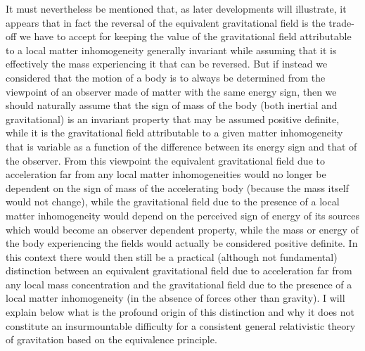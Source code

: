 \documentclass[notitlepage,12pt]{report}
\begin{document}
It must nevertheless be mentioned that, as later developments will illustrate, it appears that in fact the reversal of the equivalent gravitational field is the trade-off we have to accept for keeping the value of the gravitational field attributable to a local matter inhomogeneity generally invariant while assuming that it is effectively the mass experiencing it that can be reversed. But if instead we considered that the motion of a body is to always be determined from the viewpoint of an observer made of matter with the same energy sign, then we should naturally assume that the sign of mass of the body (both inertial and gravitational) is an invariant property that may be assumed positive definite, while it is the gravitational field attributable to a given matter inhomogeneity that is variable as a function of the difference between its energy sign and that of the observer. From this viewpoint the equivalent gravitational field due to acceleration far from any local matter inhomogeneities would no longer be dependent on the sign of mass of the accelerating body (because the mass itself would not change), while the gravitational field due to the presence of a local matter inhomogeneity would depend on the perceived sign of energy of its sources which would become an observer dependent property, while the mass or energy of the body experiencing the fields would actually be considered positive definite. In this context there would then still be a practical (although not fundamental) distinction between an equivalent gravitational field due to acceleration far from any local mass concentration and the gravitational field due to the presence of a local matter inhomogeneity (in the absence of forces other than gravity). I will explain below what is the profound origin of this distinction and why it does not constitute an insurmountable difficulty for a consistent general relativistic theory of gravitation based on the equivalence principle.
\end{document}
